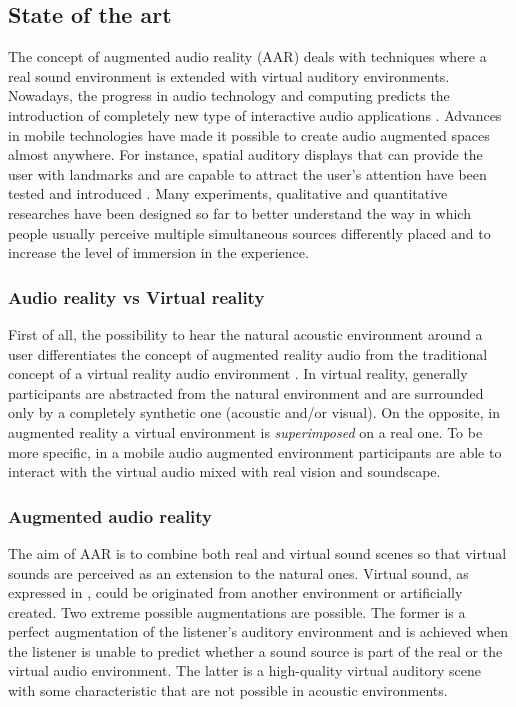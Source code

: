 \documentclass[journal]{IEEEtran}
\begin{document}
\subsection{State of the art}
The concept of augmented audio reality (AAR) deals with techniques where a real sound environment is extended with virtual auditory environments. Nowadays, the progress in audio technology and computing predicts the introduction of completely new type of interactive audio applications \cite{}. Advances in mobile technologies have made it possible to create audio augmented spaces almost anywhere. For instance, spatial auditory displays that can provide the user with landmarks and are capable to attract the user's attention have been tested and introduced \cite{}. Many experiments, qualitative and quantitative researches have been designed so far to better understand the way in which people usually perceive multiple simultaneous sources differently placed and to increase the level of immersion in the experience.

\subsubsection{Audio reality vs Virtual reality}
First of all, the possibility to hear the natural acoustic environment around a user differentiates the concept of augmented reality audio from the traditional concept of a virtual reality audio environment \cite{}. In virtual reality, generally participants are abstracted from the natural environment and are surrounded only by a completely synthetic one (acoustic and/or visual). On the opposite, in augmented reality a virtual environment is \emph{superimposed} on a real one. To be more specific, in a mobile audio augmented environment participants are able to interact with the virtual audio mixed with real vision and soundscape.

\subsubsection{Augmented audio reality}
The aim of AAR is to combine both real and virtual sound scenes so that virtual sounds are perceived as an extension to the natural ones. Virtual sound, as expressed in \cite{}, could be originated from another environment or artificially created. Two extreme possible augmentations are possible. The former is a perfect augmentation of the listener's auditory environment and is achieved when the listener is unable to predict whether a sound source is part of the real or the virtual audio environment. The latter is a high-quality virtual auditory scene with some characteristic that are not possible in acoustic environments.
\end{document}
